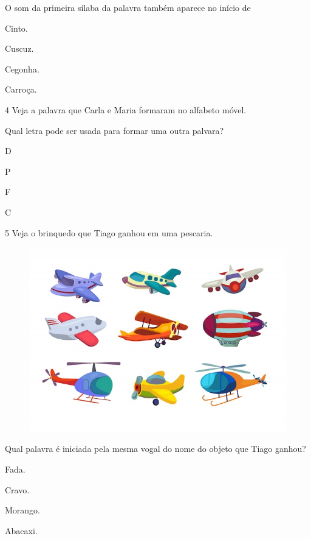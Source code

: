 
O som da primeira sílaba da palavra também aparece no início de

\begin{escolha}
\item Cinto.

\item Cuscuz.

\item Cegonha.

\item Carroça.
\end{escolha}


\num{4} Veja a palavra que Carla e Maria formaram no alfabeto móvel.

Qual letra pode ser usada para formar uma outra palvara?

\begin{escolha}
\item D

\item P

\item F

\item C
\end{escolha}

\num{5} Veja o brinquedo que Tiago ganhou em uma pescaria.

\begin{figure}[htpb!]
\centering
\includegraphics[width=.5\textwidth]{media/image177.jpeg}
\end{figure}


Qual palavra é iniciada pela mesma vogal do nome do objeto que Tiago ganhou?

\begin{escolha}
\item Fada.

\item Cravo.

\item Morango.

\item Abacaxi.
\end{escolha}

